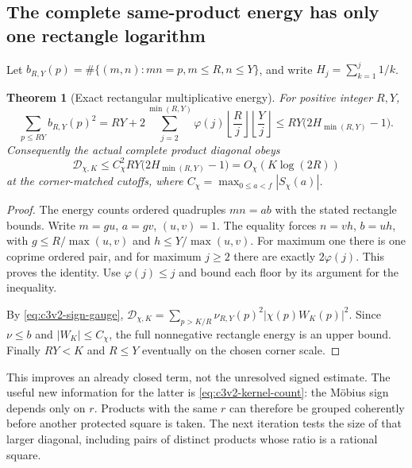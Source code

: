 \documentclass[11pt]{article}
\newtheorem{theorem}{Theorem}[section]
\theoremstyle{remark}
\begin{document}
\subsection{The complete same-product energy has only one rectangle logarithm}

Let \(b_{R,Y}(p)=\#\{(m,n):mn=p,m\le R,n\le Y\}\), and
write \(H_j=\sum_{k=1}^j1/k\).

\begin{theorem}[Exact rectangular multiplicative energy]
\label{thm:c3v2-rectangle-energy}
For positive integer \(R,Y\),
\begin{equation}
 \sum_{p\le RY}b_{R,Y}(p)^2
 =RY+2\sum_{j=2}^{\min(R,Y)}\varphi(j)
             \left\lfloor\frac Rj\right\rfloor
             \left\lfloor\frac Yj\right\rfloor
 \le RY\bigl(2H_{\min(R,Y)}-1\bigr).
 \label{eq:c3v2-rectangle-energy}
\end{equation}
Consequently the actual complete product diagonal obeys
\begin{equation}
 \mathcal D_{\chi,K}
 \le C_\chi^2RY\bigl(2H_{\min(R,Y)}-1\bigr)
 =O_\chi(K\log(2R))
 \label{eq:c3v2-D-bound}
\end{equation}
at the corner-matched cutoffs, where
\(C_\chi=\max_{0\le a<f}|S_\chi(a)|\).
\end{theorem}

\begin{proof}
The energy counts ordered quadruples \(mn=ab\) with the stated
rectangle bounds.  Write \(m=gu\), \(a=gv\), \((u,v)=1\).
The equality forces \(n=vh\), \(b=uh\), with
\(g\le R/\max(u,v)\) and \(h\le Y/\max(u,v)\).
For maximum one there is one coprime ordered pair, and for maximum
\(j\ge2\) there are exactly \(2\varphi(j)\).  This proves the
identity.  Use \(\varphi(j)\le j\) and bound each floor by its
argument for the inequality.

By \eqref{eq:c3v2-sign-gauge},
\(\mathcal D_{\chi,K}=\sum_{p>K/R}\nu_{R,Y}(p)^2
|\chi(p)W_K(p)|^2\).  Since \(\nu\le b\) and
\(|W_K|\le C_\chi\), the full nonnegative rectangle energy is
an upper bound.  Finally \(RY<K\) and \(R\le Y\) eventually
on the chosen corner scale.
\end{proof}

This improves an already closed term, not the unresolved signed
estimate.  The useful new information for the latter is
\eqref{eq:c3v2-kernel-count}: the M\"obius sign depends only on
\(r\).  Products with the same \(r\) can therefore be grouped
coherently before another protected square is taken.  The next
iteration tests the size of that larger diagonal, including pairs
of distinct products whose ratio is a rational square.
\end{document}
